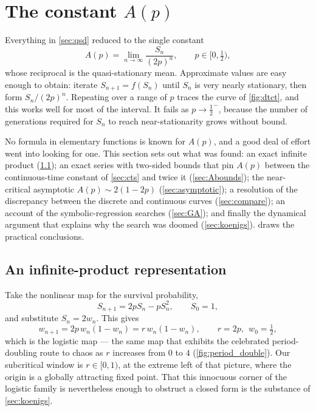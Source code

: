 \section{The constant \texorpdfstring{$A(p)$}{A(p)}}
\label{sec:Ap}

Everything in \cref{sec:qsd} reduced to the single constant
\begin{equation}
\label{eq:Ap-def}
A(p) = \lim_{n\to\infty}\frac{S_n}{(2p)^n},\qquad p\in[0,\tfrac12),
\end{equation}
whose reciprocal is the quasi-stationary mean. Approximate values are easy enough to
obtain: iterate $S_{n+1} = f(S_n)$ until $S_n$ is very nearly stationary, then form
$S_n/(2p)^n$. Repeating over a range of $p$ traces the curve of \cref{fig:dtct}, and
this works well for most of the interval. It fails as $p\to\tfrac12^-$, because the
number of generations required for $S_n$ to reach near-stationarity grows without bound.

No formula in elementary functions is known for $A(p)$, and a good deal of effort went
into looking for one. This section sets out what was found: an exact infinite product
(\cref{sec:product}); an exact series with two-sided bounds that pin $A(p)$ between the
continuous-time constant of \cref{sec:cts} and twice it (\cref{sec:Abounds}); the
near-critical asymptotic $A(p)\sim2(1-2p)$ (\cref{sec:asymptotic}); a resolution of the
discrepancy between the discrete and continuous curves (\cref{sec:compare}); an account
of the symbolic-regression searches (\cref{sec:GA}); and finally the dynamical argument
that explains why the search was doomed (\cref{sec:koenigs}).  draws
the practical conclusions.

\subsection{An infinite-product representation}
\label{sec:product}

Take the nonlinear map for the survival probability,
\begin{equation*}
S_{n+1} = 2pS_n - pS_n^2,\qquad S_0=1,
\end{equation*}
and substitute $S_n = 2w_n$. This gives
\begin{equation}
\label{eq:logistic}
w_{n+1} = 2p\,w_n(1-w_n) = r\,w_n(1-w_n),\qquad r = 2p,\ \ w_0 = \tfrac12 ,
\end{equation}
which is the logistic map --- the same map that exhibits the celebrated period-doubling
route to chaos as $r$ increases from $0$ to $4$ (\cref{fig:period_double}). Our
subcritical window is $r\in[0,1)$, at the extreme left of that picture, where the origin
is a globally attracting fixed point. That this innocuous corner of the logistic family
is nevertheless enough to obstruct a closed form is the substance of \cref{sec:koenigs}.

